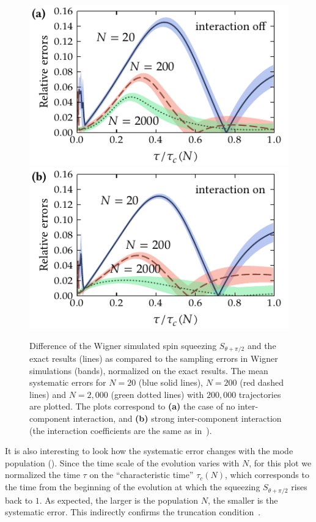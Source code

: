 \begin{figure}
    \centerline{%
    \includegraphics{figures_generated/exact/squeezing_nocc_N_err.pdf}%
    \includegraphics{figures_generated/exact/squeezing_cc_N_err.pdf}}

    \caption[Dependence of systematic errors in Wigner simulated spin squeezing on the particle number]{
    Difference of the Wigner simulated spin squeezing $S_{\theta+\pi/2}$ and the exact results (lines) as compared to the sampling errors in Wigner simulations (bands), normalized on the exact results.
    The mean systematic errors for $N=20$ (blue solid lines), $N=200$ (red dashed lines) and $N=2,000$ (green dotted lines) with $200,000$ trajectories are plotted.
    The plots correspond to \textbf{(a)} the case of no inter-component interaction, and \textbf{(b)} strong inter-component interaction (the interaction coefficients are the same as in~).}%

    \label{fig:exact:squeezing-N-error-comparison}
\end{figure}

It is also interesting to look how the systematic error changes with the mode population ().
Since the time scale of the evolution varies with $N$, for this plot we normalized the time $\tau$ on the ``characteristic time'' $\tau_c(N)$, which corresponds to the time from the beginning of the evolution at which the squeezing $S_{\theta+\pi/2}$ rises back to $1$.
As expected, the larger is the population $N$, the smaller is the systematic error.
This indirectly confirms the truncation condition~.

